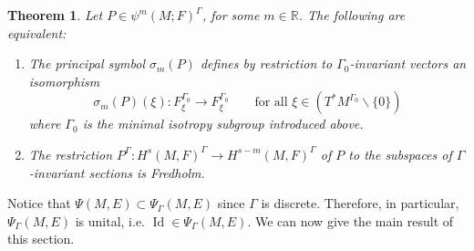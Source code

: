 \documentclass[11pt,a4paper]{amsart}
\newcommand{\End}{\operatorname{End}}
\newcommand{\C}{\mathbb C}
\newcommand{\R}{\mathbb R}
\newcommand{\maC}{\mathcal C}
\newcommand\<{\langle}
\renewcommand\>{\rangle}
\newcommand{\oid}{\operatorname{Id}}
\newtheorem{theorem}{Theorem}[section]
\theoremstyle{definition}
\newtheorem{remark}[theorem]{Remark}
\begin{document}
\begin{theorem}%
\label{thm.BCLN}
Let %
$P \in \psi^m(M;F)^\Gamma$, for some $m
\in \R$.  The following are equivalent:
\begin{enumerate}\renewcommand\labelenumi{\rm (\roman{enumi})}
\item The principal symbol $\sigma_m(P)$ defines by restriction to $\Gamma_0$-invariant vectors an
  isomorphism
      \begin{equation*}\label{mainsmbl1}
        \sigma_m(P)(\xi):F_\xi^{\Gamma_0}\longrightarrow F_\xi^{\Gamma_0} \qquad \text{for all }\xi\in (T^*M^{\Gamma_0} \smallsetminus \{ 0\}) 
      \end{equation*}
 where $\Gamma_0$ is the minimal isotropy subgroup introduced above.     
\item The restriction   $P^\Gamma : H^{s}(M,F)^\Gamma \longrightarrow H^{s-m}(M,F)^\Gamma$
 of $P$ to the subspaces of $\Gamma$-invariant sections is Fredholm.      
\end{enumerate}  
\end{theorem}



Notice that $\Psi(M,E) \subset \Psi_\Gamma(M,E)$ since $\Gamma$ is discrete.
Therefore, in particular, $\Psi_\Gamma(M,E)$ is unital, i.e. $\oid \in \Psi_\Gamma(M,E)$.
We can now give the main result of this section.
\end{document}
